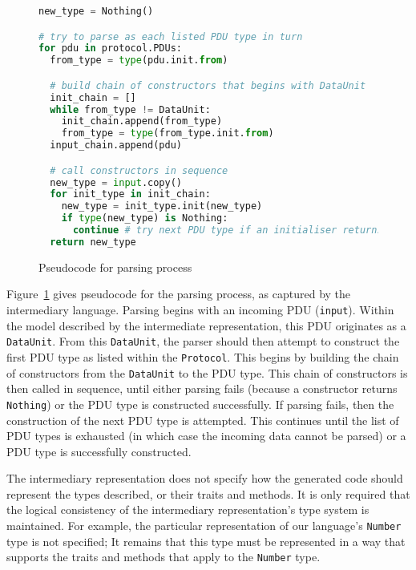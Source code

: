 \documentclass[10pt,twocolumn,a4paper]{article}
\newcommand{\code}[1]{\texttt{#1}}
\begin{document}
\begin{figure}
\begin{lstlisting}[language=Python]
new_type = Nothing()

# try to parse as each listed PDU type in turn
for pdu in protocol.PDUs:
  from_type = type(pdu.init.from)

  # build chain of constructors that begins with DataUnit
  init_chain = []
  while from_type != DataUnit:
    init_chain.append(from_type)
    from_type = type(from_type.init.from)
  input_chain.append(pdu)

  # call constructors in sequence
  new_type = input.copy()
  for init_type in init_chain:
    new_type = init_type.init(new_type)
    if type(new_type) is Nothing:
      continue # try next PDU type if an initialiser returns Nothing
  return new_type
\end{lstlisting}
\caption{Pseudocode for parsing process}
\label{fig:parsing-pseudocode}
\end{figure}

Figure~\ref{fig:parsing-pseudocode} gives pseudocode for the parsing process, as
captured by the intermediary language. Parsing begins with an incoming PDU
(\code{input}). Within the model described by the intermediate representation,
this PDU originates as a \code{DataUnit}. From this \code{DataUnit}, the
parser should then attempt to construct the first PDU type as listed within the
\code{Protocol}. This begins by building the chain of constructors from the
\code{DataUnit} to the PDU type. This chain of constructors is then called in
sequence, until either parsing fails (because a constructor returns
\code{Nothing}) or the PDU type is constructed successfully. If parsing fails,
then the construction of the next PDU type is attempted. This continues until
the list of PDU types is exhausted (in which case the incoming data cannot be
parsed) or a PDU type is successfully constructed.

The intermediary representation does not specify how the generated code should
represent the types described, or their traits and methods. It is only required
that the logical consistency of the intermediary representation's type system
is maintained. For example, the particular representation of our language's
\code{Number} type is not specified; It remains that this type must be
represented in a way that supports the traits and methods that apply to the
\code{Number} type.

\end{document}
